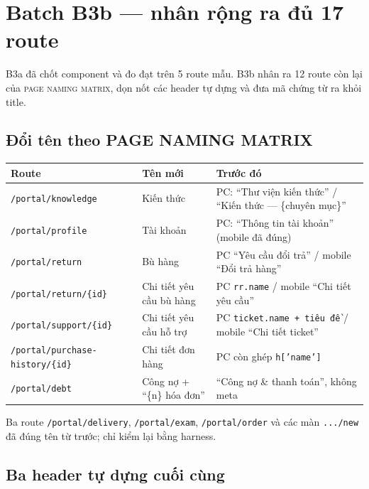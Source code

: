 \section{Batch B3b --- nhân rộng ra đủ 17 route}

B3a đã chốt component và đo đạt trên 5 route mẫu. B3b nhân ra 12 route còn lại của
\textsc{page naming matrix}, dọn nốt các header tự dựng và đưa mã chứng từ ra khỏi title.

\subsection{Đổi tên theo PAGE NAMING MATRIX}

\begin{longtable}{@{}p{4.7cm}p{3.6cm}p{6.4cm}@{}}
\toprule
\textbf{Route} & \textbf{Tên mới} & \textbf{Trước đó} \\
\midrule
\endhead
\texttt{/portal/knowledge} & Kiến thức & PC: ``Thư viện kiến thức'' / ``Kiến thức --- \{chuyên mục\}'' \\
\texttt{/portal/profile} & Tài khoản & PC: ``Thông tin tài khoản'' (mobile đã đúng) \\
\texttt{/portal/return} & Bù hàng & PC ``Yêu cầu đổi trả'' / mobile ``Đổi trả hàng'' \\
\texttt{/portal/return/\{id\}} & Chi tiết yêu cầu bù hàng & PC \texttt{rr.name} / mobile ``Chi tiết yêu cầu'' \\
\texttt{/portal/support/\{id\}} & Chi tiết yêu cầu hỗ trợ & PC \texttt{ticket.name + tiêu đề} / mobile ``Chi tiết ticket'' \\
\texttt{/portal/purchase-history/\{id\}} & Chi tiết đơn hàng & PC còn ghép \texttt{h['name']} \\
\texttt{/portal/debt} & Công nợ + ``\{n\} hóa đơn'' & ``Công nợ \& thanh toán'', không meta \\
\bottomrule
\end{longtable}

Ba route \texttt{/portal/delivery}, \texttt{/portal/exam}, \texttt{/portal/order} và các màn
\texttt{.../new} đã đúng tên từ trước; chỉ kiểm lại bằng harness.

\subsection{Ba header tự dựng cuối cùng}

